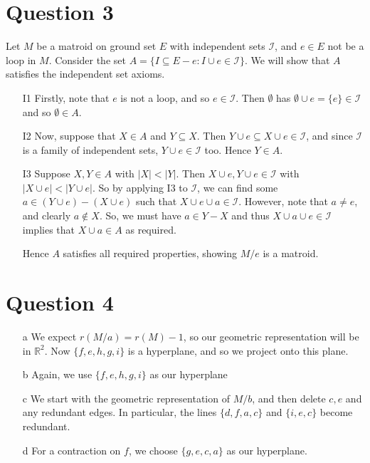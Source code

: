 \documentclass{article}
\begin{document}
\section*{Question 3}
Let $M$ be a matroid on ground set $E$ with independent sets $\mathcal{I}$, and $e\in E$ not be a loop in $M$.
Consider the set $A=\{I\subseteq E-e:I\cup e\in \mathcal{I}\}$. We will show that $A$ satisfies the independent set axioms.

\begin{enumerate}
    \item[I1] Firstly, note that $e$ is not a loop, and so $e\in\mathcal{I}$. Then $\emptyset$ has $\emptyset\cup e=\{e\}\in\mathcal{I}$
    and so $\emptyset\in A$.
    \item[I2] Now, suppose that $X\in A$ and $Y\subseteq X$. Then $Y\cup e\subseteq X\cup e\in\mathcal{I}$, and since $\mathcal{I}$
        is a family of independent sets, $Y\cup e\in\mathcal{I}$ too. Hence $Y\in A$.
    \item[I3] Suppose $X, Y\in A$ with $|X|<|Y|$. Then $X\cup e, Y\cup e\in\mathcal{I}$ with $|X\cup e|<|Y\cup e|$.
        So by applying I3 to $\mathcal{I}$, we can find some $a\in (Y\cup e)-(X\cup e)$ such that $X\cup e\cup a\in\mathcal{I}$.
        However, note that $a\ne e$, and clearly $a\not\in X$. So, we must have $a\in Y-X$ and thus $X\cup a\cup e\in\mathcal{I}$
        implies that $X\cup a\in A$ as required.

    Hence $A$ satisfies all required properties, showing $M/e$ is a matroid.
\end{enumerate}

\section*{Question 4}
\begin{enumerate}
    \item[a] We expect $r(M/a)=r(M)-1$, so our geometric representation will be in $\mathbb{R}^2$. Now $\{f, e, h, g, i\}$ is a hyperplane,
        and so we project onto this plane.
    \item[b] Again, we use $\{f, e, h, g, i\}$ as our hyperplane
    \item[c] We start with the geometric representation of $M/b$, and then delete $c, e$ and any redundant edges.
        In particular, the lines $\{d, f, a, c\}$ and $\{i, e, c\}$ become redundant.
    \item[d] For a contraction on $f$, we choose $\{g, e, c, a\}$ as our hyperplane.

\end{enumerate}
\end{document}
